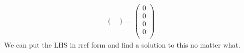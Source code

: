\documentclass{homework}
\begin{document}
\begin{solution}
\begin{align*}
\begin{pmatrix}
                                                                                                                                                                                                                                \end{pmatrix}
                                                                                                                                                                                                                                    =
                                                                                                                                                                                                                                        \begin{pmatrix}
                                                                                                                                                                                                                                            0\\0\\0\\0\\
                                                                                                                                                                                                                                                \end{pmatrix}
                                                                                                                                                                                                                                                \end{align*}
                                                                                                                                                                                                                                                We can put the LHS in rref form and find a solution to this no matter what.
                                                                                                                                                                                                                                                \end{solution}
\end{document}

